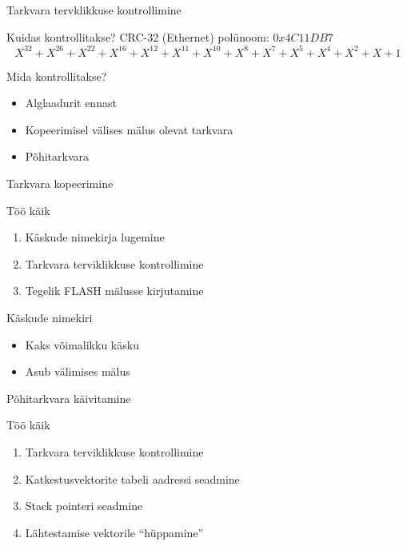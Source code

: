 \documentclass[pdf,draft]{beamer}
\begin{document}
\begin{frame}{Tarkvara tervklikkuse kontrollimine}
    \begin{block}{Kuidas kontrollitakse?}
        CRC-32 (Ethernet) polünoom: \( 0x4C11DB7\)
        \[ X^{32} + X^{26} + X^{22} + X^{16} + X^{12}
            + X^{11} + X^{10} + X^8 + X^7 + X^5 + X^4
        + X^2 + X + 1\]
    \end{block}
    \begin{block}{Mida kontrollitakse?}
        \begin{itemize}
            \item Alglaadurit ennast
            \item Kopeerimisel välises mälus olevat tarkvara
            \item Põhitarkvara
        \end{itemize}
    \end{block}
\end{frame}

\begin{frame}{Tarkvara kopeerimine}
    \begin{block}{Töö käik}
        \begin{enumerate}
            \item Käskude nimekirja lugemine
            \item Tarkvara terviklikkuse kontrollimine
            \item Tegelik FLASH mälusse kirjutamine
        \end{enumerate}
    \end{block}
    \begin{block}{Käskude nimekiri}
        \begin{itemize}
            \item Kaks võimalikku käsku
            \item Asub välimises mälus
        \end{itemize}
    \end{block}
\end{frame}

\begin{frame}{Põhitarkvara käivitamine}
    \begin{block}{Töö käik}
        \begin{enumerate}
            \item Tarkvara terviklikkuse kontrollimine
            \item Katkestusvektorite tabeli aadressi seadmine
            \item Stack pointeri seadmine
            \item Lähtestamise vektorile ``hüppamine''
        \end{enumerate}
    \end{block}
\end{frame}
\end{document}

